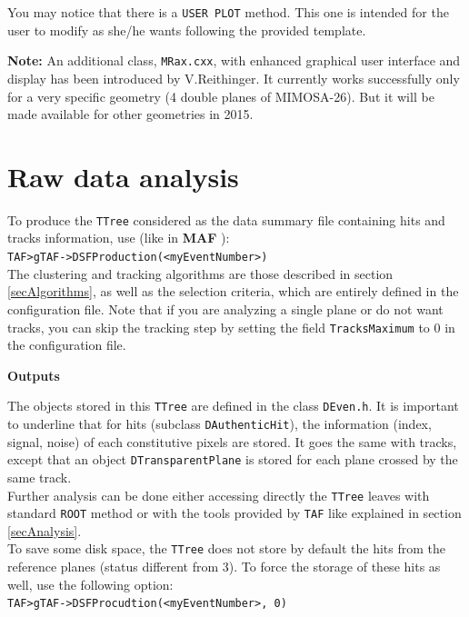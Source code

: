 \documentclass[a4paper, 12pt, twoside]{article}
\newcommand{\MAF}{{\bf MAF }}
\begin{document}
\noindent
You may notice that there is a {\tt USER PLOT} method. This one is intended for the user to modify as she/he wants following the provided template.

\vspace{.8 cm}

\noindent
{\bf Note:} An additional class, {\tt MRax.cxx}, with enhanced graphical user interface and display has been introduced by V.Reithinger. It currently works successfully only for a very specific geometry (4 double planes of MIMOSA-26). But it will be made available for other geometries in 2015.\\



\vspace{2cm}

\section{Raw data analysis}
\label{secRawdata}

To produce the {\tt TTree} considered as the data summary file containing hits and tracks information, use (like in \MAF):\\
{\tt TAF>gTAF->DSFProduction(<myEventNumber>)}\\

\noindent
The clustering and tracking algorithms are those described in section \ref{secAlgorithms}, as well as the selection criteria, which are entirely defined in the configuration file. Note that if you are analyzing a single plane or do not want tracks, you can skip the tracking step by setting the field {\tt TracksMaximum} to $0$ in the configuration file.

\vspace{0.8 cm}

\noindent
{\bf Outputs}

\noindent
The objects stored in this {\tt TTree} are defined in the class {\tt DEven.h}. It is important to underline that for hits (subclass {\tt DAuthenticHit}), the information (index, signal, noise) of each constitutive pixels are stored. It goes the same with tracks, except that an object {\tt DTransparentPlane} is stored for each plane crossed by the same track.\\
Further analysis can be done either accessing directly the {\tt TTree} leaves with standard {\tt ROOT} method or with the tools provided by {\tt TAF} like explained in section \ref{secAnalysis}.\\
To save some disk space, the {\tt TTree} does not store by default the hits from the reference planes (status different from 3). To force the storage of these hits as well, use the following option:\\
{\tt TAF>gTAF->DSFProcudtion(<myEventNumber>, 0)}\\
\end{document}

